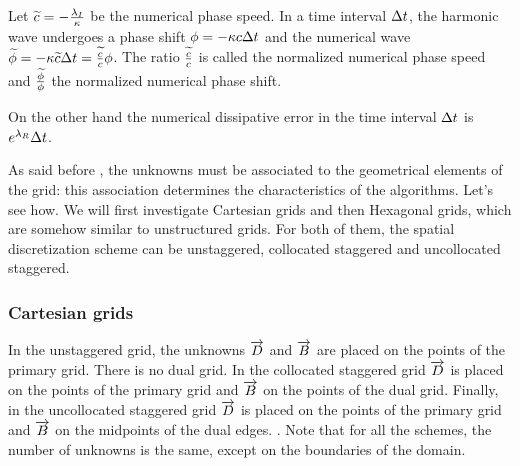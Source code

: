 Let $\widetilde{c} = -\frac{\lambda_I}{\kappa}$ be the numerical phase
speed. In a time interval $\Delta t$, the harmonic wave undergoes a
phase shift $\phi = -\kappa c \Delta t$ and the numerical wave
$\widetilde{\phi} = -\kappa \widetilde{c} \Delta t = \frac{\widetilde{c}}{c}
\phi$. The ratio $\frac{\widetilde{c}}{c}$ is called the normalized
numerical phase speed and $\frac{\widetilde{\phi}}{\phi}$ the normalized
numerical phase shift.

On the other hand the numerical dissipative error in the time interval
$\Delta t$ is $e^{\lambda_R} \Delta t$.

As said before , the unknowns must be associated to the
geometrical elements of the grid: this association determines the
characteristics of the algorithms. Let's see how. We will first
investigate Cartesian grids and then Hexagonal grids, which are
somehow similar to unstructured grids. For both of them, the spatial
discretization scheme can be unstaggered, collocated staggered and
uncollocated staggered.

\subsubsection{Cartesian grids}

In the unstaggered grid, the unknowns $\overrightarrow{D}$ and $\overrightarrow{B}$ are placed on
the points of the primary grid. There is no dual grid. In the
collocated staggered grid $\overrightarrow{D}$ is placed on the points of the primary
grid and $\overrightarrow{B}$ on the points of the dual grid. Finally, in the
uncollocated staggered grid $\overrightarrow{D}$ is placed on the points of the primary
grid and $\overrightarrow{B}$ on the midpoints of the dual edges. . Note that for all the schemes, the number of unknowns is
the same, except on the boundaries of the domain.

